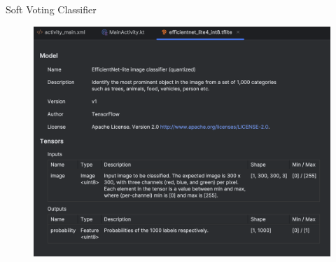\documentclass{beamer}%
\begin{document}
\begin{frame}{Soft Voting Classifier}
\begin{changemargin}
\footnotesize

\begin{figure}[h]
\begin{minipage}[h]{0.91\linewidth}
\hbox{\hspace{-2em}\includegraphics[width=0.91\linewidth]{img/efficientnet_spec}}
\end{minipage}
\end{figure}

\end{changemargin}
\end{frame}
\end{document}
